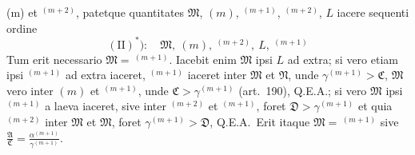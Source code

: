 \documentclass[12pt,a4paper]{article}
\theoremstyle{plain}
\theoremstyle{definition}
\theoremstyle{remark}
\newcommand{\qeoa}{\textsc{Q.E.A.}}
\begin{document}
(m) et $^{(m+2)}$, patetque quantitates $\mathfrak{M}$, $(m)$, $^{(m+1)}$, $^{(m+2)}$, $L$ iacere sequenti ordine
\[(\text{II})^{*}):\quad \mathfrak{M},\ (m),\ ^{(m+2)},\ L,\ ^{(m+1)}\]
Tum erit necessario $\mathfrak{M}=\,^{(m+1)}$. Iacebit enim $\mathfrak{M}$ ipsi $L$ ad extra; si vero etiam ipsi $^{(m+1)}$ ad extra iaceret, $^{(m+1)}$ iaceret inter $\mathfrak{M}$ et $\mathfrak{N}$, unde $\gamma^{(m+1)}>\mathfrak{C}$, $\mathfrak{M}$ vero inter $(m)$ et $^{(m+1)}$, unde $\mathfrak{C}>\gamma^{(m+1)}$ (art.\ 190), \qeoa; si vero $\mathfrak{M}$ ipsi $^{(m+1)}$ a laeva iaceret, sive inter $^{(m+2)}$ et $^{(m+1)}$, foret $\mathfrak{D}>\gamma^{(m+1)}$ et quia $^{(m+2)}$ inter $\mathfrak{M}$ et $\mathfrak{M}$, foret $\gamma^{(m+1)}>\mathfrak{D}$, \qeoa\ Erit itaque $\mathfrak{M}=\,^{(m+1)}$ sive $\frac{\mathfrak{A}}{\mathfrak{C}}=\frac{\alpha^{(m+1)}}{\gamma^{(m+1)}}$.
\end{document}
